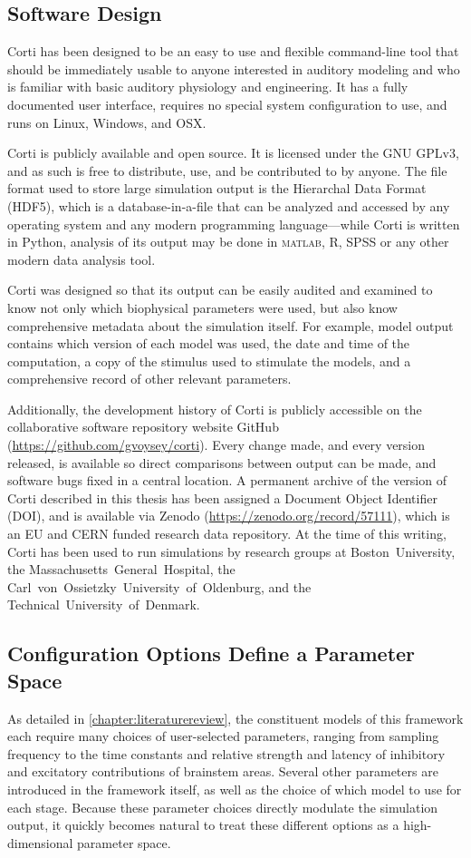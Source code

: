 \subsection{Software Design} %
\label{sub:software_design}
Corti has been designed to be an easy to use and flexible command-line tool that should be immediately usable to anyone interested in auditory modeling and who is familiar with basic auditory physiology and engineering.  It has a fully documented user interface, requires no special system configuration to use, and runs on Linux, Windows, and OSX.

Corti is publicly available and open source. It is licensed under the GNU GPLv3, and as such is free to distribute, use, and be contributed to by anyone.  The file format used to store large simulation output is the Hierarchal Data Format (HDF5), which is a database-in-a-file that can be analyzed and accessed by any operating system and any modern programming language---while Corti is written in Python, analysis of its output may be done in \textsc{matlab}, R, SPSS or any other modern data analysis tool.

Corti was designed so that its output can be easily audited and examined to know not only which biophysical parameters were used, but also know comprehensive metadata about the simulation itself.  For example, model output contains which version of each model was used, the date and time of the computation, a copy of the stimulus used to stimulate the models, and a comprehensive record of other relevant parameters. 

Additionally, the development history of Corti is publicly accessible on the collaborative software repository website GitHub (\url{https://github.com/gvoysey/corti}).  Every change made, and every version released, is available so direct comparisons between output can be made, and software bugs fixed in a central location.  A permanent archive of the version of Corti described in this thesis has been assigned a Document Object Identifier (DOI), and is available via Zenodo (\url{https://zenodo.org/record/57111}), which is an EU and CERN funded research data repository.  At the time of this writing, Corti has been used to run simulations by research groups at Boston~University, the Massachusetts~General~Hospital, the Carl~von~Ossietzky~University~of~Oldenburg, and the Technical~University~of~Denmark.  

\subsection{Configuration Options Define a Parameter Space}
As detailed in \autoref{chapter:literaturereview}, the constituent models of this framework each require many choices of user-selected parameters, ranging from sampling frequency to the time constants and relative strength and latency of inhibitory and excitatory contributions of brainstem areas. Several other parameters are introduced in the framework itself, as well as the choice of which model to use for each stage. Because these parameter choices directly modulate the simulation output, it quickly becomes natural to treat these different options as a high-dimensional parameter space.  

